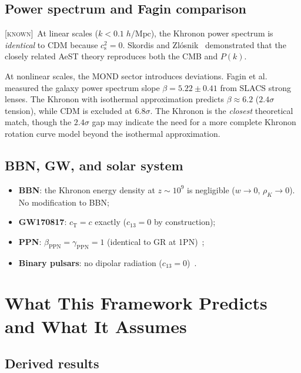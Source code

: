 \documentclass[prd,twocolumn,superscriptaddress,longbibliography,floatfix]{revtex4-2}
\newcommand{\cs}{c_{\mathrm{s}}}
\newcommand{\cT}{c_{\mathrm{T}}}
\newcommand{\known}{\textsc{[known]}}
\begin{document}
\subsection{Power spectrum and Fagin comparison}

\known\  At linear scales ($k < 0.1\;h/\mathrm{Mpc}$), the
Khronon power spectrum is \emph{identical} to CDM because
$\cs^2 = 0$.  Skordis and Zl\'{o}snik~\cite{SZ2021prl}
demonstrated that the closely related AeST theory reproduces
both the CMB and $P(k)$.

At nonlinear scales, the MOND sector introduces deviations.
Fagin et al.~\cite{Fagin2024} measured the galaxy power spectrum
slope $\beta = 5.22 \pm 0.41$ from SLACS strong lenses.  The
Khronon with isothermal approximation predicts
$\beta \approx 6.2$ ($2.4\sigma$ tension), while CDM is
excluded at $6.8\sigma$.  The Khronon is the \emph{closest}
theoretical match, though the $2.4\sigma$ gap may indicate
the need for a more complete Khronon rotation curve model
beyond the isothermal approximation.

\subsection{BBN, GW, and solar system}

\begin{itemize}
\item \textbf{BBN}: the Khronon energy density at $z \sim 10^9$
  is negligible ($w \to 0$, $\rho_K \to 0$).  No
  modification to BBN;
\item \textbf{GW170817}: $\cT = c$ exactly
  ($c_{13} = 0$ by construction);
\item \textbf{PPN}: $\beta_{\mathrm{PPN}} = \gamma_{\mathrm{PPN}} = 1$
  (identical to GR at 1PN)~\cite{BS2024,FosterJacobson2006};
\item \textbf{Binary pulsars}: no dipolar radiation
  ($c_{13} = 0$)~\cite{YagiBBY2014}.
\end{itemize}


\section{What This Framework Predicts and What It Assumes}
\label{sec:predictions}

\subsection{Derived results}
\end{document}
